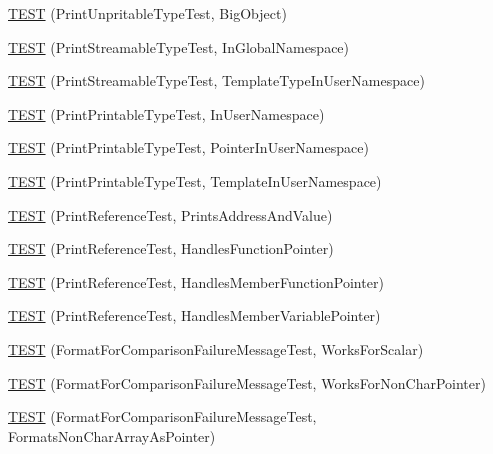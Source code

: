 \begin{DoxyCompactItemize}
\item 
\hyperlink{namespacetesting_1_1gtest__printers__test_a6b6fba2a191094244f8aa78a4933a2c5}{T\-E\-S\-T} (Print\-Unpritable\-Type\-Test, Big\-Object)
\item 
\hyperlink{namespacetesting_1_1gtest__printers__test_a80fe9d71227a97b12fd5336a823c3d17}{T\-E\-S\-T} (Print\-Streamable\-Type\-Test, In\-Global\-Namespace)
\item 
\hyperlink{namespacetesting_1_1gtest__printers__test_a8ccd96504d676671a0429073d5012ff1}{T\-E\-S\-T} (Print\-Streamable\-Type\-Test, Template\-Type\-In\-User\-Namespace)
\item 
\hyperlink{namespacetesting_1_1gtest__printers__test_a52f5df394111bcc55aecc59ce426088d}{T\-E\-S\-T} (Print\-Printable\-Type\-Test, In\-User\-Namespace)
\item 
\hyperlink{namespacetesting_1_1gtest__printers__test_a3da6191eff6b016540024c2bfccdd90b}{T\-E\-S\-T} (Print\-Printable\-Type\-Test, Pointer\-In\-User\-Namespace)
\item 
\hyperlink{namespacetesting_1_1gtest__printers__test_aa697a3cf25b7f51f26ab49ed8ac3dd31}{T\-E\-S\-T} (Print\-Printable\-Type\-Test, Template\-In\-User\-Namespace)
\item 
\hyperlink{namespacetesting_1_1gtest__printers__test_aeae9b61a9fe582c72580db1466631846}{T\-E\-S\-T} (Print\-Reference\-Test, Prints\-Address\-And\-Value)
\item 
\hyperlink{namespacetesting_1_1gtest__printers__test_aab47074bb60b087e80675a44ad8c88ba}{T\-E\-S\-T} (Print\-Reference\-Test, Handles\-Function\-Pointer)
\item 
\hyperlink{namespacetesting_1_1gtest__printers__test_a88f9089e0b19be4bda74a953d6a47d7b}{T\-E\-S\-T} (Print\-Reference\-Test, Handles\-Member\-Function\-Pointer)
\item 
\hyperlink{namespacetesting_1_1gtest__printers__test_af9c63486049ac0ec2a1db65904702eb3}{T\-E\-S\-T} (Print\-Reference\-Test, Handles\-Member\-Variable\-Pointer)
\item 
\hyperlink{namespacetesting_1_1gtest__printers__test_aa7429c3701e464d0047a82686a5e8a46}{T\-E\-S\-T} (Format\-For\-Comparison\-Failure\-Message\-Test, Works\-For\-Scalar)
\item 
\hyperlink{namespacetesting_1_1gtest__printers__test_adb093d9323bfb766be8c91215c46056e}{T\-E\-S\-T} (Format\-For\-Comparison\-Failure\-Message\-Test, Works\-For\-Non\-Char\-Pointer)
\item 
\hyperlink{namespacetesting_1_1gtest__printers__test_a3571808f93f419268b6aed1aa127ea30}{T\-E\-S\-T} (Format\-For\-Comparison\-Failure\-Message\-Test, Formats\-Non\-Char\-Array\-As\-Pointer)

\end{DoxyCompactItemize}
